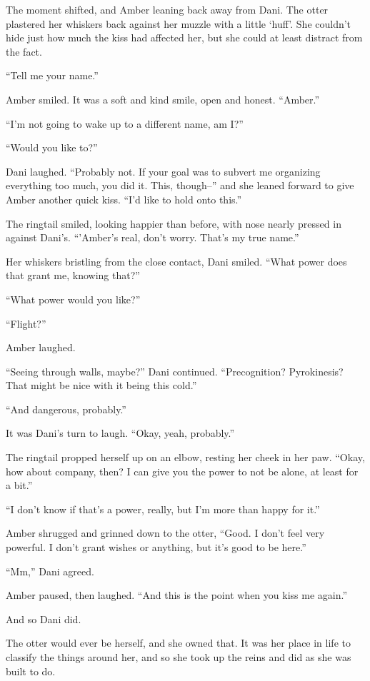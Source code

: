 The moment shifted, and Amber leaning back away from Dani. The otter plastered her whiskers back against her muzzle with a little `huff'. She couldn't hide just how much the kiss had affected her, but she could at least distract from the fact.

``Tell me your name.''

Amber smiled. It was a soft and kind smile, open and honest. ``Amber.''

``I'm not going to wake up to a different name, am I?''

``Would you like to?''

Dani laughed. ``Probably not. If your goal was to subvert me organizing everything too much, you did it. This, though--'' and she leaned forward to give Amber another quick kiss. ``I'd like to hold onto this.''

The ringtail smiled, looking happier than before, with nose nearly pressed in against Dani's. ``'Amber's real, don't worry. That's my true name.''

Her whiskers bristling from the close contact, Dani smiled. ``What power does that grant me, knowing that?''

``What power would you like?''

``Flight?''

Amber laughed.

``Seeing through walls, maybe?'' Dani continued. ``Precognition? Pyrokinesis? That might be nice with it being this cold.''

``And dangerous, probably.''

It was Dani's turn to laugh. ``Okay, yeah, probably.''

The ringtail propped herself up on an elbow, resting her cheek in her paw. ``Okay, how about company, then? I can give you the power to not be alone, at least for a bit.''

``I don't know if that's a power, really, but I'm more than happy for it.''

Amber shrugged and grinned down to the otter, ``Good. I don't feel very powerful. I don't grant wishes or anything, but it's good to be here.''

``Mm,'' Dani agreed.

Amber paused, then laughed. ``And this is the point when you kiss me again.''

And so Dani did.

The otter would ever be herself, and she owned that. It was her place in life to classify the things around her, and so she took up the reins and did as she was built to do.


